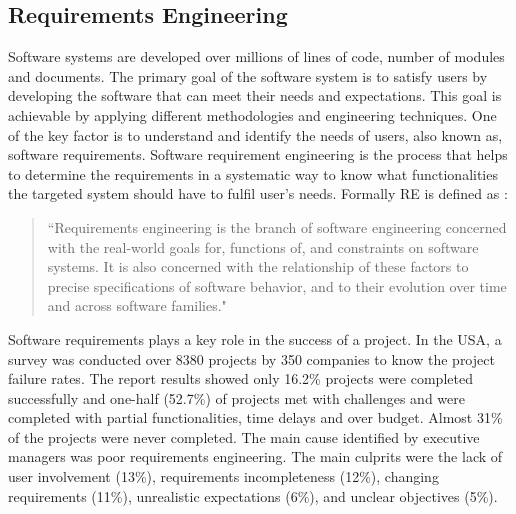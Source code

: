 \subsection{Requirements Engineering}

Software systems are developed over millions of lines of code, number of modules
and documents. The primary goal of the software system is to satisfy users by
developing the software that can meet their needs and expectations. This goal is
achievable by applying different methodologies and engineering techniques. One
of the key factor is to understand and identify the needs of users, also known
as, software requirements. Software requirement engineering is the process that
helps to determine the requirements in a systematic way to know what
functionalities the targeted system should have to fulfil user's needs. Formally
RE is defined as \cite{Zave:1997:CRE:267580.267581}:
\begin{quote}
``Requirements engineering is the branch of software engineering concerned with the real-world
goals for, functions of, and constraints on software systems. It is also concerned with the
relationship of these factors to precise specifications of software behavior, and to their evolution
over time and across software families."
\end{quote}

	Software requirements plays a key role in the success of a project. In the USA, a
survey was conducted over 8380 projects by 350 companies to know the project
failure rates. The report \cite{StandishReport} results showed only 16.2\% projects were
completed successfully and one-half (52.7\%) of projects met with challenges and
were completed with partial functionalities, time delays and over budget. Almost
31\% of the projects were never completed. The main cause identified by
executive managers was poor requirements engineering. The main culprits were the lack of
user involvement (13\%), requirements incompleteness (12\%), changing requirements
(11\%), unrealistic expectations (6\%), and unclear objectives
(5\%). 

